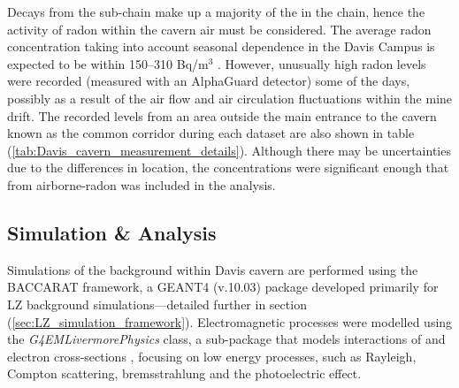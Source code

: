 Decays from the \RnTTT{} sub-chain make up a majority of the \grays{} in the \UTTE{} chain, hence the activity of radon within the cavern air must be considered. The average radon concentration taking into account seasonal dependence in the Davis Campus is expected to be within 150--310 Bq/m$^3$ \cite{Heise_2015}. However, unusually high radon levels were recorded (measured with an AlphaGuard detector) some of the days, possibly as a result of the air flow and air circulation fluctuations within the mine drift. The recorded levels from an area outside the main entrance to the cavern known as the common corridor during each dataset are also shown in table (\ref{tab:Davis_cavern_measurement_details}). Although there may be uncertainties due to the differences in location, the concentrations were significant enough that \grays{} from airborne-radon was included in the analysis.




\subsection{Simulation \& Analysis}
\label{secsec:simulations_analysis}

Simulations of the \gray{} background within Davis cavern are performed using the \textsc{BACCARAT} framework, a \textsc{GEANT4} (v.10.03) \cite{Geant4} package developed primarily for LZ background simulations---detailed further in section (\ref{sec:LZ_simulation_framework}). Electromagnetic processes were modelled using the \textit{G4EMLivermorePhysics} class, a sub-package that models interactions of \gray{} and electron cross-sections \cite{osti_295438, osti_5691165}, focusing on low energy processes, such as Rayleigh, Compton scattering, bremsstrahlung and the photoelectric effect. 

